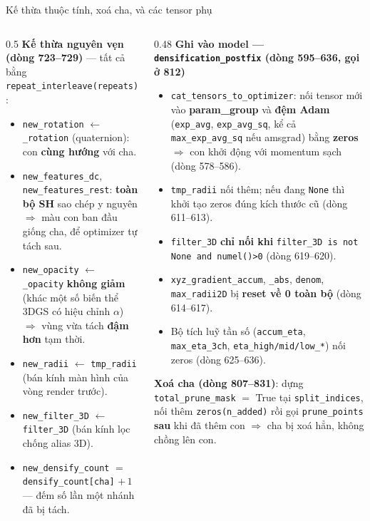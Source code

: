 \begin{frame}{Kế thừa thuộc tính, xoá cha, và các tensor phụ}
\scriptsize
\begin{columns}[T]
\begin{column}{0.5\linewidth}
\textbf{Kế thừa nguyên vẹn (dòng 723--729)} --- tất cả bằng \texttt{repeat\_interleave(repeats)}:
\begin{itemize}
  \item \texttt{new\_rotation} $\leftarrow$ \texttt{\_rotation} (quaternion): con \textbf{cùng hướng} với cha.
  \item \texttt{new\_features\_dc}, \texttt{new\_features\_rest}: \textbf{toàn bộ SH} sao chép y nguyên $\Rightarrow$ màu con ban đầu giống cha, để optimizer tự tách sau.
  \item \texttt{new\_opacity} $\leftarrow$ \texttt{\_opacity} \textbf{không giảm} (khác một số biến thể 3DGS có hiệu chỉnh $\alpha$) $\Rightarrow$ vùng vừa tách \textbf{đậm hơn} tạm thời.
  \item \texttt{new\_radii} $\leftarrow$ \texttt{tmp\_radii} (bán kính màn hình của vòng render trước).
  \item \texttt{new\_filter\_3D} $\leftarrow$ \texttt{filter\_3D} (bán kính lọc chống alias 3D).
  \item \texttt{new\_densify\_count} $=$ \texttt{densify\_count[cha]} $+\,1$ --- đếm số lần một nhánh đã bị tách.
\end{itemize}
\end{column}
\begin{column}{0.48\linewidth}
\textbf{Ghi vào model --- \texttt{densification\_postfix} (dòng 595--636, gọi ở 812)}
\begin{itemize}
  \item \texttt{cat\_tensors\_to\_optimizer}: nối tensor mới vào \textbf{param\_group} và \textbf{đệm Adam} (\texttt{exp\_avg}, \texttt{exp\_avg\_sq}, kể cả \texttt{max\_exp\_avg\_sq} nếu amsgrad) bằng \textbf{zeros} $\Rightarrow$ con khởi động với momentum sạch (dòng 578--586).
  \item \texttt{tmp\_radii} nối thêm; nếu đang \texttt{None} thì khởi tạo zeros đúng kích thước cũ (dòng 611--613).
  \item \texttt{filter\_3D} \textbf{chỉ nối khi} \texttt{filter\_3D is not None and numel()>0} (dòng 619--620).
  \item \texttt{xyz\_gradient\_accum}, \texttt{\_abs}, \texttt{denom}, \texttt{max\_radii2D} bị \textbf{reset về 0 toàn bộ} (dòng 614--617).
  \item Bộ tích luỹ tần số (\texttt{accum\_eta}, \texttt{max\_eta\_3ch}, \texttt{eta\_high/mid/low\_*}) nối zeros (dòng 625--636).
\end{itemize}
\textbf{Xoá cha (dòng 807--831)}: dựng \texttt{total\_prune\_mask} $=$ True tại \texttt{split\_indices}, nối thêm \texttt{zeros(n\_added)} rồi gọi \texttt{prune\_points} \textbf{sau} khi đã thêm con $\Rightarrow$ cha bị xoá hẳn, không chồng lên con.
\end{column}
\end{columns}
\end{frame}


